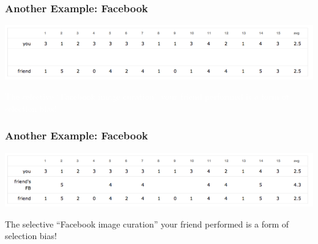 \documentclass[slides]{beamer}
\begin{document}
\begin{frame}
\frametitle{Another Example: Facebook}

\begin{center}
\includegraphics[width=\textwidth]{./figure/FB3}
\end{center}

\textcolor{white}{The selective ``Facebook image curation'' your friend performed is a form of selection bias!}

\end{frame}


\begin{frame}
\frametitle{Another Example: Facebook}

\begin{center}
\includegraphics[width=\textwidth]{./figure/FB4}
\end{center}

\pause The selective ``Facebook image curation'' your friend performed is a form of selection bias!

\end{frame}
\end{document}
